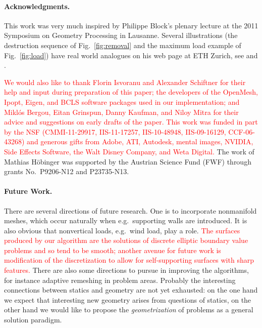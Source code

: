 \documentclass[annual]{acmsiggraph}
\newcommand{\newtext}[1]{\textcolor{red}{#1}}
\begin{document}
\paragraph*{Acknowledgments.}

This work was very much inspired by Philippe Block's plenary lecture
at the 2011 Symposium on Geometry Processing in Lausanne. Several
illustrations (the destruction sequence of Fig.~\ref{fig:removal}
and the maximum load example of Fig.~\ref{fig:load}) have real\dash 
world analogues on his web page at ETH Zurich, see
\cite{catalan} and \cite{blockfigs}.

\newtext{We would also like to thank Florin Isvoranu and Alexander Schiftner for their help and input during preparation of this paper; the developers of the OpenMesh, Ipopt, Eigen, and BCLS software packages used in our implementation; and Mikl\'{o}s Bergou, Eitan Grinspun, Danny Kaufman, and Niloy Mitra for their advice and suggestions on early drafts of the paper. This work was funded in part by the NSF (CMMI-11-29917, IIS-11-17257, IIS-10-48948, IIS-09-16129, CCF-06-43268) and generous gifts from Adobe, ATI, Autodesk, mental images, NVIDIA, Side Effects Software, the Walt Disney Company, and Weta Digital.} The work of
Mathias H\"obinger was supported by the Austrian Science Fund (FWF)
through grants No.\ P9206-N12 and P23735-N13.

\paragraph{Future Work.}

There are several directions of future research. One is to incorporate
non\dash manifold meshes, which occur naturally when e.g.\ supporting
walls are introduced. It is also obvious that non\dash vertical loads,
e.g.\ wind load, play a role. \newtext{The surfaces produced by our algorithm are the solutions of discrete elliptic boundary value problems and so tend to be smooth; another avenue for future work is modification of the discretization to allow for self-supporting surfaces with sharp features.} There are also some directions to pursue in
improving the algorithms, for instance adaptive remeshing in problem
areas. Probably the interesting connections between statics and
geometry are not yet exhausted: on the one hand we expect that interesting
new geometry arises from questions of statics, on the other hand
we would like to propose the {\em
geometrization} of problems as a general solution paradigm.
\end{document}
